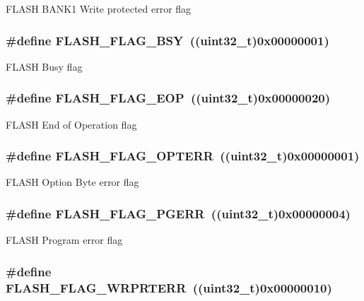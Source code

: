 \label{group__FLASH__Flags_ga1646345adbcda773ef25785b1bdc4c43}
FLASH BANK1 Write protected error flag \hypertarget{group__FLASH__Flags_gad3bc368f954ad7744deda3315da2fff7}{
\subsubsection[{FLASH\_\-FLAG\_\-BSY}]{\setlength{\rightskip}{0pt plus 5cm}\#define FLASH\_\-FLAG\_\-BSY~((uint32\_\-t)0x00000001)}}
\label{group__FLASH__Flags_gad3bc368f954ad7744deda3315da2fff7}
FLASH Busy flag \hypertarget{group__FLASH__Flags_gaf043ba4d8f837350bfc7754a99fae5a9}{
\subsubsection[{FLASH\_\-FLAG\_\-EOP}]{\setlength{\rightskip}{0pt plus 5cm}\#define FLASH\_\-FLAG\_\-EOP~((uint32\_\-t)0x00000020)}}
\label{group__FLASH__Flags_gaf043ba4d8f837350bfc7754a99fae5a9}
FLASH End of Operation flag \hypertarget{group__FLASH__Flags_gac36b0605df97c9414933369a32251e4a}{
\subsubsection[{FLASH\_\-FLAG\_\-OPTERR}]{\setlength{\rightskip}{0pt plus 5cm}\#define FLASH\_\-FLAG\_\-OPTERR~((uint32\_\-t)0x00000001)}}
\label{group__FLASH__Flags_gac36b0605df97c9414933369a32251e4a}
FLASH Option Byte error flag \hypertarget{group__FLASH__Flags_gae2ef62dee0a5ca01e6226746039b6f20}{
\subsubsection[{FLASH\_\-FLAG\_\-PGERR}]{\setlength{\rightskip}{0pt plus 5cm}\#define FLASH\_\-FLAG\_\-PGERR~((uint32\_\-t)0x00000004)}}
\label{group__FLASH__Flags_gae2ef62dee0a5ca01e6226746039b6f20}
FLASH Program error flag \hypertarget{group__FLASH__Flags_ga5c59a7f07507cac38091275964d3d35d}{
\subsubsection[{FLASH\_\-FLAG\_\-WRPRTERR}]{\setlength{\rightskip}{0pt plus 5cm}\#define FLASH\_\-FLAG\_\-WRPRTERR~((uint32\_\-t)0x00000010)}}
